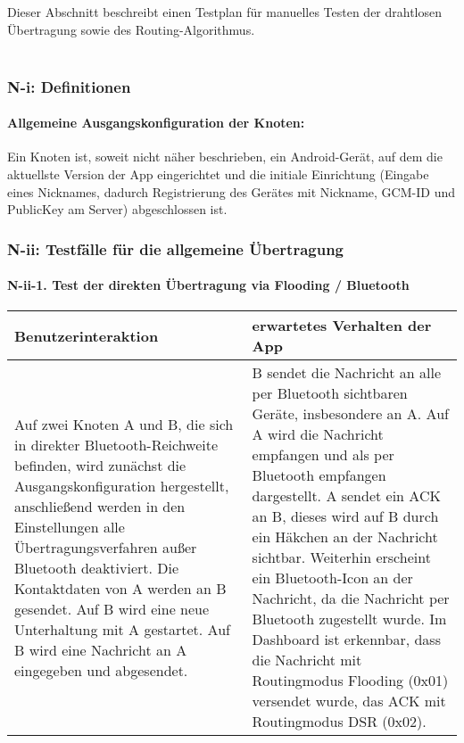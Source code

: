 
Dieser Abschnitt beschreibt einen Testplan für manuelles Testen der
drahtlosen Übertragung sowie des Routing-Algorithmus.\\\\


\subsubsection{N-i: Definitionen}\label{i-definitionen}

\paragraph{Allgemeine Ausgangskonfiguration der
Knoten:}\label{allgemeine-ausgangskonfiguration-der-knoten}

Ein Knoten ist, soweit nicht näher beschrieben, ein Android-Gerät, auf
dem die aktuellste Version der App eingerichtet und die initiale
Einrichtung (Eingabe eines Nicknames, dadurch Registrierung des Gerätes
mit Nickname, GCM-ID und PublicKey am Server) abgeschlossen ist.
\clearpage



\subsubsection{N-ii: Testfälle für die allgemeine
Übertragung}\label{ii-testfuxe4lle-fuxfcr-die-allgemeine-uxfcbertragung}

\paragraph{N-ii-1. Test der direkten Übertragung via Flooding /
Bluetooth}\label{test-der-direkten-uxfcbertragung-via-flooding-bluetooth}

\begin{longtable}{p{8cm}p{8.5cm}}
\toprule
Benutzerinteraktion & erwartetes Verhalten der App\tabularnewline
\midrule
\endhead
Auf zwei Knoten A und B, die sich in direkter Bluetooth-Reichweite
befinden, wird zunächst die Ausgangskonfiguration hergestellt,
anschließend werden in den Einstellungen alle Übertragungsverfahren
außer Bluetooth deaktiviert. Die Kontaktdaten von A werden an B
gesendet. Auf B wird eine neue Unterhaltung mit A gestartet. Auf B wird
eine Nachricht an A eingegeben und abgesendet. & B sendet die Nachricht
an alle per Bluetooth sichtbaren Geräte, insbesondere an A. Auf A wird
die Nachricht empfangen und als per Bluetooth empfangen dargestellt. A
sendet ein ACK an B, dieses wird auf B durch ein Häkchen an der
Nachricht sichtbar. Weiterhin erscheint ein Bluetooth-Icon an der
Nachricht, da die Nachricht per Bluetooth zugestellt wurde. Im Dashboard
ist erkennbar, dass die Nachricht mit Routingmodus Flooding (0x01)
versendet wurde, das ACK mit Routingmodus DSR (0x02).\tabularnewline
\bottomrule
\end{longtable}

